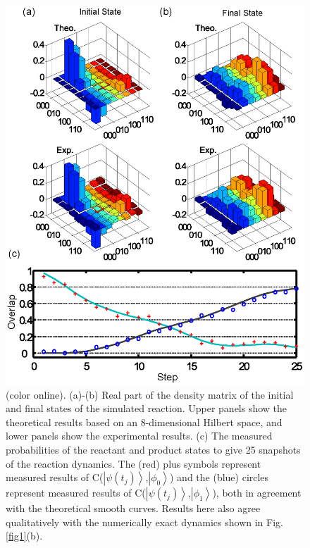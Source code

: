 \documentclass[prl,twocolumn,showpacs]{revtex4}
\begin{document}
\begin{figure}[htb]
\begin{center}
\includegraphics[width= 0.9\columnwidth]{tomo.eps}
\end{center}
\setlength{\abovecaptionskip}{-0.35cm}
\caption{\footnotesize{(color online). (a)-(b) Real part of the density matrix of the initial and final states of the simulated reaction.
Upper panels show the theoretical results based on an 8-dimensional Hilbert space, and lower panels show the experimental results.
(c) The measured probabilities of the reactant and product states to give 25 snapshots of the reaction dynamics.   The (red) plus symbols represent measured results of C($\left\vert \psi(t_j)\right\rangle$,$\left\vert \phi_{0} \right\rangle$) and the (blue) circles represent measured results of C($\left\vert \psi(t_j) \right\rangle$,$\left\vert \phi_{1} \right\rangle$), both in agreement with the theoretical smooth curves.  Results here also agree qualitatively
with the numerically exact dynamics shown in Fig. \ref{fig1}(b).}}\label{tomo}
\end{figure}
\end{document}

